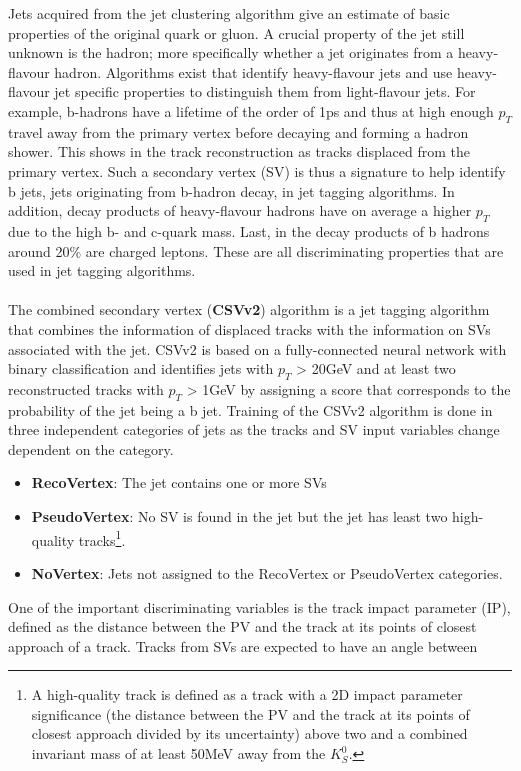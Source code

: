 Jets acquired from the jet clustering algorithm give an estimate of basic properties of the original quark or gluon. A crucial property of the jet still unknown is the hadron; more specifically whether a jet originates from a heavy-flavour hadron. Algorithms exist that identify heavy-flavour jets and use heavy-flavour jet specific properties to distinguish them from light-flavour jets. For example, b-hadrons have a lifetime of the order of 1ps and thus at high enough $p_T$ travel away from the primary vertex before decaying and forming a hadron shower. This shows in the track reconstruction as tracks displaced from the primary vertex. Such a secondary vertex (SV) is thus a signature to help identify b jets, jets originating from b-hadron decay, in jet tagging algorithms. In addition, decay products of heavy-flavour hadrons have on average a higher $p_T$ due to the high b- and c-quark mass. Last, in the decay products of b hadrons around 20\% are charged leptons. These are all discriminating properties that are used in jet tagging algorithms.\\
\\
The combined secondary vertex (\textbf{CSVv2}) algorithm is a jet tagging algorithm that combines the information of displaced tracks with the information on SVs associated with the jet. CSVv2 is based on a fully-connected neural network with binary classification and identifies jets with $p_T$ > 20GeV and at least two reconstructed tracks with $p_T$ > 1GeV by assigning a score that corresponds to the probability of the jet being a b jet. Training of the CSVv2 algorithm is done in three independent categories of jets as the tracks and SV input variables change dependent on the category.
\begin{itemize}
    \item \textbf{RecoVertex}: The jet contains one or more SVs
    \item \textbf{PseudoVertex}: No SV is found in the jet but the jet has least two high-quality tracks\footnote{A high-quality track is defined as a track with a 2D impact parameter significance (the distance between the PV and the track at its points of closest approach divided by its uncertainty) above two and a combined invariant mass of at least 50MeV away from the $K_S^0$.}.
    \item \textbf{NoVertex}: Jets not assigned to the RecoVertex or PseudoVertex categories.
\end{itemize}
One of the important discriminating variables is the track impact parameter (IP), defined as the distance between the PV and the track at its points of closest approach of a track. Tracks from SVs are expected to have an angle between

